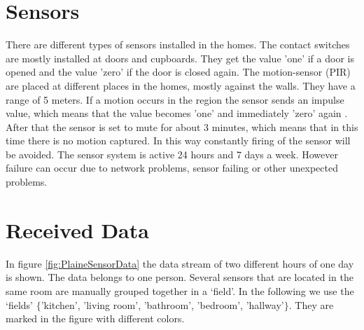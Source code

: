 \section{Sensors}
There are different types of sensors installed in the homes. The contact switches are mostly installed at doors and cupboards. They get the value 'one' if a door is opened and the value 'zero' if the door is closed again.
The motion-sensor (PIR) are placed at different places in the homes, mostly against the walls. They have a range of 5 meters. If a motion occurs in the region the sensor sends an impulse value, which means that the value becomes 'one' and immediately 'zero' again . After that the sensor is set to mute for about 3 minutes, which means that in this time there is no motion captured. In this way constantly firing of the sensor will be avoided. The sensor system is active 24 hours and 7 days a week. However failure can occur due to network problems, sensor failing or other unexpected problems.

\section{Received Data}
In figure \ref{fig:PlaineSensorData} the data stream of two different hours of one day is shown. The data belongs to one person. Several sensors that are located in the same room are manually grouped together in a `field'. In the following we use the `fields' $\{$'kitchen', 'living room', 'bathroom', 'bedroom', 'hallway'$\}$. They are marked in the figure with different colors.

